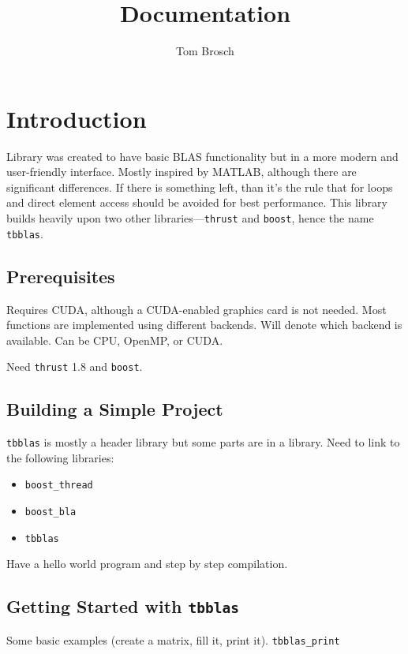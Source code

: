 \documentclass{article}
\title{\tbblas Documentation}
\author{Tom Brosch}
\newcommand{\tbblas}{\texttt{tbblas}\xspace}
\begin{document}
\maketitle
\tableofcontents

\section{Introduction}

Library was created to have basic BLAS functionality but in a more modern and
user-friendly interface. Mostly inspired by MATLAB, although there are
significant differences. If there is something left, than it's the rule that for
loops and direct element access should be avoided for best performance. This
library builds heavily upon two other libraries---\texttt{thrust} and
\texttt{boost}, hence the name \tbblas.

\subsection{Prerequisites}

Requires CUDA, although a CUDA-enabled graphics card is not needed. Most
functions are implemented using different backends. Will denote which backend is
available. Can be CPU, OpenMP, or CUDA.

Need \texttt{thrust} 1.8 and \texttt{boost}.

\subsection{Building a Simple Project}

\tbblas is mostly a header library but some parts are in a library. Need to link
to the following libraries:
\begin{itemize}
  \item \verb|boost_thread|
  \item \verb|boost_bla|
  \item \tbblas
\end{itemize}

Have a hello world program and step by step compilation.

\subsection{Getting Started with \tbblas}

Some basic examples (create a matrix, fill it, print it).
\texttt{tbblas\_print}
\end{document}
